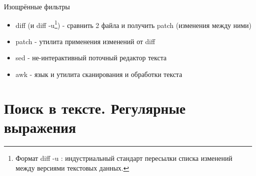 \begin{frame}{Изощрённые фильтры }
  \begin{itemize}
    \item \alert{diff} (и \alert{diff -u}\footnote{Формат \alert{diff -u} : индустриальный стандарт пересылки списка изменений между версиями текстовых данных.}) - сравнить 2 файла и получить patch (изменения между ними)
    \item \alert{patch} - утилита применения изменений от diff \pause
    \item \alert{sed} - не-интерактивный поточный редактор текста 
    \item \alert{awk} - язык и утилита сканирования и обработки текста
  \end{itemize}
\end{frame}


\section{Поиск в тексте. Регулярные выражения}



